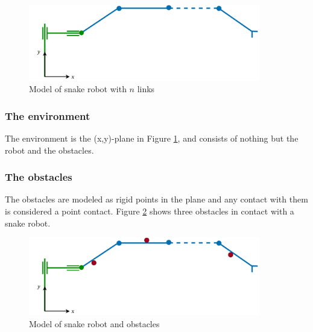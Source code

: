 \begin{figure}
    \centering
    \includegraphics[width=0.9\textwidth]{figures/modelspecs/superbasicsnake.pdf}
    \caption{Model of snake robot with $n$ links}
    \label{fig:2_kin}
\end{figure}


\subsubsection{The environment}
The environment is the (x,y)-plane in Figure \ref{fig:2_kin}, and consists of nothing but the robot and the obstacles.



\subsubsection{The obstacles}

The obstacles are modeled as rigid points in the plane and any contact with them is considered a point contact. Figure \ref{fig:2_kin_obst} shows three obstacles in contact with a snake robot.

\begin{figure}[h!]
    \centering
    \includegraphics[width=0.9\textwidth]{figures/modelspecs/superbasicsnakenobstacles.pdf}
    \caption{Model of snake robot and obstacles}
    \label{fig:2_kin_obst}
\end{figure}








